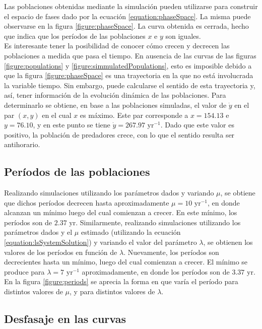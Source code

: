 \documentclass[journal, monochrome]{IEEEtran}
\begin{document}
Las poblaciones obtenidas mediante la simulación pueden utilizarse para construir el espacio de fases dado por la ecuación \ref{equation:phaseSpace}. La misma puede observarse en la figura \ref{figure:phaseSpace}. 
La curva obtenida es cerrada, hecho que indica que los períodos de las poblaciones $x$ e $y$ son iguales.\\

Es interesante tener la posibilidad de conocer cómo crecen y decrecen las poblaciones a medida que pasa el tiempo. En ausencia de las curvas de las figuras \ref{figure:populations} y 
\ref{figure:simmulatedPopulations}, esto es imposible debido a que la figura \ref{figure:phaseSpace} es una trayectoria en la que no está involucrada la variable tiempo. Sin embargo, 
puede calcularse el sentido de esta trayectoria y, así, tener información de la evolución dinámica de las poblaciones. Para determinarlo se obtiene, en base a las poblaciones simuladas, 
el valor de $\dot{y}$ en el par $(x, y)$ en el cual $x$ es máximo. Este par corresponde a $x = 154.13$ e $y = 76.10$, y en este punto se tiene $\dot{y} = 267.97 \text{ yr}^{-1}$. Dado que este valor es positivo,
la población de predadores crece, con lo que el sentido resulta ser antihorario.

\subsection{Períodos de las poblaciones}

Realizando simulaciones utilizando los parámetros dados y variando $\mu$, se obtiene que
dichos períodos decrecen hasta aproximadamente $\mu = 10 \text{ yr}^{-1}$, en donde alcanzan un mínimo luego del cual comienzan a crecer. En este mínimo, los períodos son de $2.37 \text{ yr}$. 
Similarmente, realizando simulaciones utilizando los parámetros dados y el $\mu$ estimado (utilizando la ecuación \ref{equation:lsSystemSolution}) y variando el valor del parámetro $\lambda$, se obtienen
los valores de los períodos en función de $\lambda$. Nuevamente, los períodos son decrecientes hasta un mínimo, luego del cual comienzan a crecer. El mínimo se produce para $\lambda = 7 \text{ yr}^{-1}$
aproximadamente, en donde los períodos son de $3.37 \text{ yr}$. En la figura \ref{figure:periods} se aprecia la forma en que varía el período para distintos valores de $\mu$, y para distintos valores de $\lambda$.


\subsection{Desfasaje en las curvas}
\end{document}

